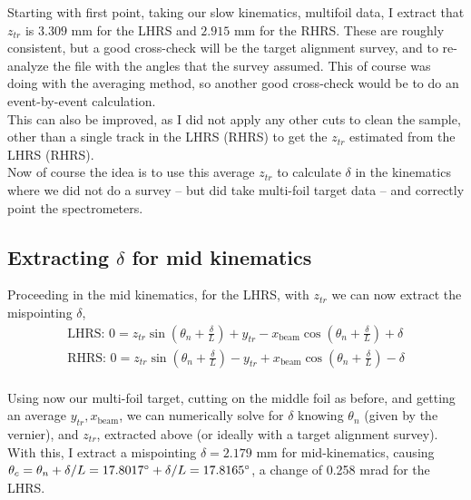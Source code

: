 \documentclass{article}
\begin{document}
Starting with first point, taking our slow kinematics, multifoil data, I extract that $z_{tr}$ is $3.309$ mm for the LHRS and $2.915$ mm for the RHRS. These are roughly consistent, but a good cross-check will be the target alignment survey, and to re-analyze the file with the angles that the survey assumed. This of course was doing with the averaging method, so another good cross-check would be to do an event-by-event calculation.\\

This can also be improved, as I did not apply any other cuts to clean the sample, other than a single track in the LHRS (RHRS) to get the $z_{tr}$ estimated from the LHRS (RHRS).\\

Now of course the idea is to use this average $z_{tr}$ to calculate $\delta$ in the kinematics where we did not do a survey -- but did take multi-foil target data -- and correctly point the spectrometers.\\

\subsection*{Extracting $\delta$ for mid kinematics}
Proceeding in the mid kinematics, for the LHRS, with $z_{tr}$ we can now extract the mispointing $\delta$,
\begin{equation*}
	\begin{gathered}
		\textrm{LHRS:       }0 = z_{tr} \sin{\left(\theta_n + \frac{\delta}{L}\right)} + y_{tr} - x_\textrm{beam} \cos{\left(\theta_n + \frac{\delta}{L}\right) } + \delta\\
		\textrm{RHRS:       }0 = z_{tr} \sin{\left(\theta_n + \frac{\delta}{L}\right)} - y_{tr} + x_\textrm{beam} \cos{\left(\theta_n + \frac{\delta}{L}\right) } - \delta\\
	\end{gathered}
\end{equation*}

Using now our multi-foil target, cutting on the middle foil as before, and getting an average $y_{tr}, x_\textrm{beam}$, we can numerically solve for $\delta$ knowing $\theta_n$ (given by the vernier), and $z_{tr}$, extracted above (or ideally with a target alignment survey).\\

With this, I extract a mispointing $\delta=2.179$ mm for mid-kinematics, causing $\theta_c = \theta_n + \delta/L = 17.8017\degree + \delta/L = 17.8165\degree$, a change of 0.258 mrad for the LHRS.\\
\end{document}
